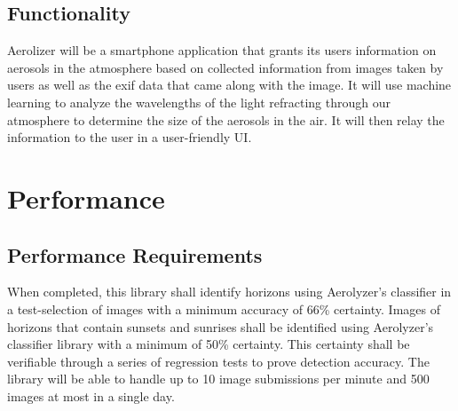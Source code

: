 \documentclass[journal,10pt,draftclsnofoot,onecolumn]{IEEEtran}
\begin{document}
\begin{singlespace}
\subsection{Functionality}
Aerolizer will be a smartphone application that grants its users information on aerosols in the atmosphere based on collected information from images taken by users as well as the exif data that came along with the image. It will use machine learning to analyze the wavelengths of the light refracting through our atmosphere to determine the size of the aerosols in the air. It will then relay the information to the user in a user-friendly UI. 

\section{Performance}
\subsection{Performance Requirements}
When completed, this library shall identify horizons using Aerolyzer's classifier in a test-selection of images with a minimum accuracy of 66\% certainty. Images of horizons that contain sunsets and sunrises shall be identified using Aerolyzer's classifier library with a minimum of 50\% certainty. This certainty shall be verifiable through a series of regression tests to prove detection accuracy.
The library will be able to handle up to 10 image submissions per minute and 500 images at most in a single day.


\nocite{*}




\end{singlespace}
\end{document}
